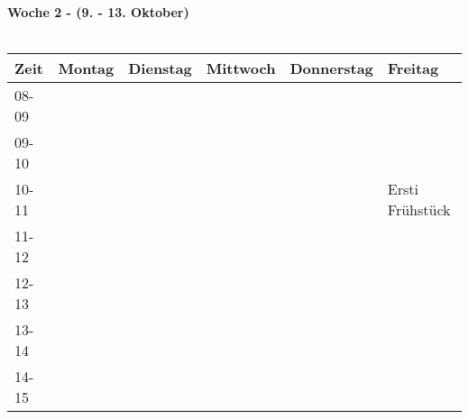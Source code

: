 \textbf{Woche 2 - (9. - 13. Oktober)}\\
\\
\begin{table}[!h]
	\begin{tabular}{|l|p{}|p{}|p{}|p{}|p{}|}
	\hline
	Zeit  & Montag                          & Dienstag                                                      & Mittwoch                        & Donnerstag                      & Freitag                 \\ \hline
	08-09 &                                 &                                                               &                                 &                                 &                         \\ \hline
	09-10 &                                 &                                                               &                                 &                                 &                         \\ \cline{1-1} \cline{6-6} 
	10-11 &                                 &                                                               &                                 &                                 & \footnotesize{Ersti Frühstück}         \\ \cline{1-1} \cline{6-6} 
	11-12 &                                 &                                                               &                                 &                                 &                         \\ \cline{1-1} \cline{6-6} 
	12-13 &                                 &                                                               &                                 &                                 &                         \\ \cline{1-1} \cline{6-6} 
	13-14 &                                 &                                                               &                                 &                                 &                         \\ \cline{1-1} \cline{6-6} 
	14-15 &                                 &                                                               &                                 &                                 &                         \\ \cline{1-1} \cline{6-6} 

\end{tabular}
\end{table}
